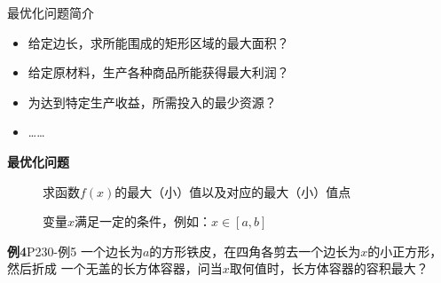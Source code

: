 \begin{frame}{最优化问题简介}
	\linespread{1.2}\pause 
	\begin{itemize}
	  \item 给定边长，求所能围成的矩形区域的最大面积？\pause 
	  \item 给定原材料，生产各种商品所能获得最大利润？\pause 
	  \item 为达到特定生产收益，所需投入的最少资源？\pause 
	  \item \ldots \ldots\pause 
	\end{itemize}
	\begin{alertblock}{{\bf 最优化问题}\hfill }\pause 
		\begin{description}
		\item[{}] \pause 求函数$f(x)$的最大（小）值以及对应的最大（小）值点\pause 
		\item[{}] \pause 变量$x$满足一定的条件，\pause 例如：$x\in[a,b]$
		\end{description}
	\end{alertblock}
\end{frame}

\begin{frame}
	\linespread{1.2}
	\begin{exampleblock}{{\bf 例4}\hfill P230-例5}
		一个边长为$a$的方形铁皮，在四角各剪去一个边长为$x$的小正方形，然后折成
		一个无盖的长方体容器，问当$x$取何值时，长方体容器的容积最大？
	\end{exampleblock}\pause 
	\begin{center}
	\end{center}
\end{frame}

